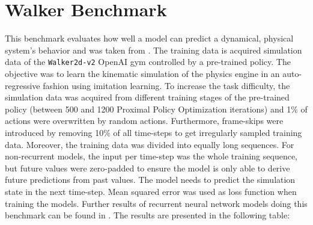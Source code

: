\documentclass[draft,final]{vutinfth} %
\begin{document}
    \section{Walker Benchmark}
    This benchmark evaluates how well a model can predict a dynamical, physical system's behavior and was taken from \cite{LongTermDependenciesIrregularTimeSeries}.
    The training data is acquired simulation data of the \texttt{Walker2d-v2} OpenAI gym \cite{OpenAIGym} controlled by a pre-trained policy.
    The objective was to learn the kinematic simulation of the physics engine in an auto-regressive fashion using imitation learning.
    To increase the task difficulty, the simulation data was acquired from different training stages of the pre-trained policy (between 500 and 1200 Proximal Policy Optimization iterations) and 1\% of actions were overwritten by random actions.
    Furthermore, frame-skips were introduced by removing 10\% of all time-steps to get irregularly sampled training data.
    Moreover, the training data was divided into equally long sequences.
    For non-recurrent models, the input per time-step was the whole training sequence, but future values were zero-padded to ensure the model is only able to derive future predictions from past values.
    The model needs to predict the simulation state in the next time-step.
    Mean squared error was used as loss function when training the models.
    Further results of recurrent neural network models doing this benchmark can be found in \cite{LatentODEsIrregularlySampled}.
    The results are presented in the following table:
\end{document}
